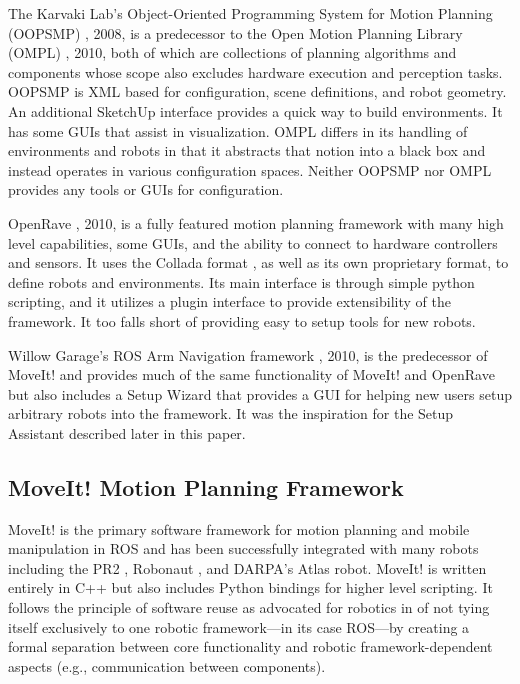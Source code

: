 \documentclass[10pt,journal,compsoc]{joser1}
\begin{document}
{The Karvaki Lab's Object-Oriented Programming System for Motion Planning (OOPSMP) \cite{oopsmp}, 2008, is a predecessor to the Open Motion Planning Library (OMPL) \cite{sucan2012the-open-motion-planning-library}, 2010, both of which are collections of planning algorithms and components whose scope also excludes hardware execution and perception tasks. OOPSMP is XML based for configuration, scene definitions, and robot geometry. An additional SketchUp interface provides a quick way to build environments. It has some GUIs that assist in visualization. OMPL differs in its handling of environments and robots in that it abstracts that notion into a black box and instead operates in various configuration spaces. Neither OOPSMP nor OMPL provides any tools or GUIs for configuration.

OpenRave  \cite{diankov2008openrave}, 2010, is a fully featured motion planning framework with many high level capabilities, some GUIs, and the ability to connect to hardware controllers and sensors. It uses the Collada format \cite{collada}, as well as its own proprietary format, to define robots and environments. Its main interface is through simple python scripting, and it utilizes a plugin interface to provide extensibility of the framework. It too falls short of providing easy to setup tools for new robots. 

Willow Garage's ROS Arm Navigation framework \cite{chitta2012perception}, 2010, is the predecessor of MoveIt! and provides much of the same functionality of MoveIt! and OpenRave but also includes a Setup Wizard that provides a GUI for helping new users setup arbitrary robots into the framework. It was the inspiration for the Setup Assistant described later in this paper.
\subsection{MoveIt! Motion Planning Framework}
\label{sec::moveit}

MoveIt!\cite{moveit} is the primary software framework for motion planning and mobile manipulation in ROS and has been successfully integrated with many robots including the PR2 \cite{wyrobek2008towards}, Robonaut \cite{ambrose2000robonaut}, and DARPA's Atlas robot. MoveIt! is written entirely in C++ but also includes Python bindings for higher level scripting. It follows the principle of software reuse as advocated for robotics in \cite{makarenko2007benefits} of not tying itself exclusively to one robotic framework---in its case ROS---by creating a formal separation between core functionality and robotic framework-dependent aspects (e.g., communication between components).

}
\end{document}
